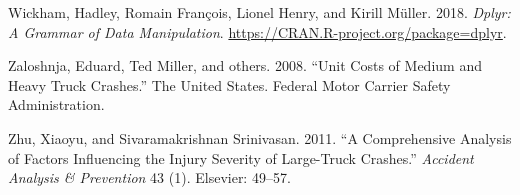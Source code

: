 \documentclass[]{elsarticle} %
\begin{document}
\leavevmode\hypertarget{ref-Rdplyr}{}%
Wickham, Hadley, Romain François, Lionel Henry, and Kirill Müller. 2018. \emph{Dplyr: A Grammar of Data Manipulation}. \url{https://CRAN.R-project.org/package=dplyr}.

\leavevmode\hypertarget{ref-zaloshnja2008unit}{}%
Zaloshnja, Eduard, Ted Miller, and others. 2008. ``Unit Costs of Medium and Heavy Truck Crashes.'' The United States. Federal Motor Carrier Safety Administration.

\leavevmode\hypertarget{ref-zhu2011comprehensive}{}%
Zhu, Xiaoyu, and Sivaramakrishnan Srinivasan. 2011. ``A Comprehensive Analysis of Factors Influencing the Injury Severity of Large-Truck Crashes.'' \emph{Accident Analysis \& Prevention} 43 (1). Elsevier: 49--57.
\end{document}
